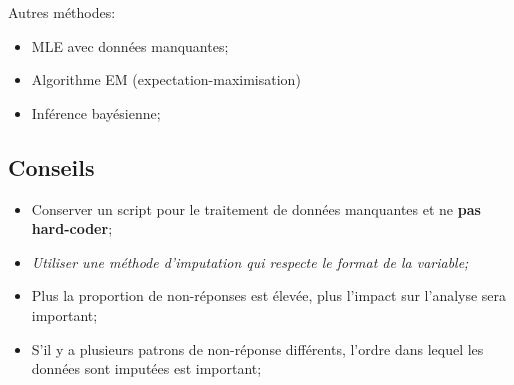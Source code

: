 \documentclass[10pt, french]{article}
\begin{document}
\begin{multicols*}{3}
Autres méthodes:
\begin{itemize}
	\item	MLE avec données manquantes;
	\item	Algorithme EM (expectation-maximisation)
	\item	Inférence bayésienne;
\end{itemize}

\subsection*{Conseils}
\begin{itemize}
	\item	Conserver un script pour le traitement de données manquantes et ne \textbf{pas hard-coder};
	\item	\textit{Utiliser une méthode d'imputation qui respecte le format de la variable;}
	\item	Plus la proportion de non-réponses est élevée, plus l'impact sur l'analyse sera important;
	\item	S'il y a plusieurs patrons de non-réponse différents, l'ordre dans lequel les données sont imputées est important;
\end{itemize}

\end{multicols*}
\end{document}
